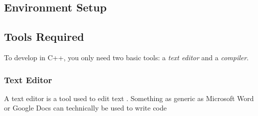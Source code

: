 \subsection{Environment Setup}

\subsection{Tools Required}

\noindent
To develop in C++, you only need two basic tools: a \textit{text editor} and a \textit{compiler}.

\subsubsection{Text Editor}

\noindent
A text editor is a tool used to edit text . Something as generic as Microsoft Word or Google Docs can technically be used to write code
